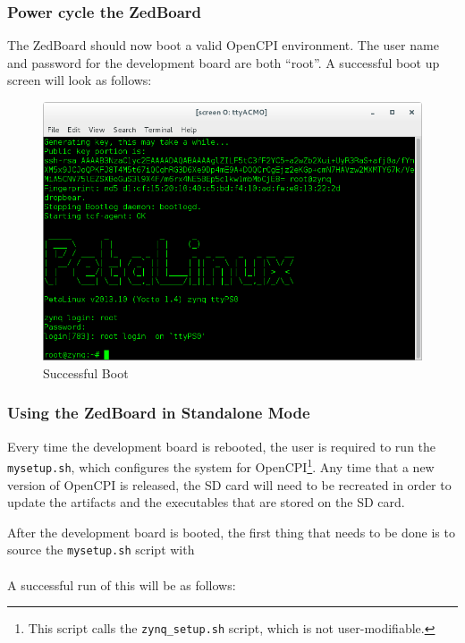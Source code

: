 \subsubsection*{Power cycle the ZedBoard}
The ZedBoard should now boot a valid OpenCPI environment.  The user name and password for the development board are both ``root''.  A successful boot up screen will look as follows:
\begin{figure}[H]
	\centerline{\includegraphics[scale=0.5]{zed_boot}}
	\caption{Successful Boot}
	\label{fig:boot2}
\end{figure}
\newpage
\subsubsection*{Using the ZedBoard in Standalone Mode}
\begin{flushleft}
Every time the development board is rebooted, the user is required to run the \texttt{mysetup.sh}, which configures the system for OpenCPI\footnote{This script calls the \texttt{zynq\_setup.sh} script, which is not user-modifiable.}. Any time that a new version of OpenCPI is released, the SD card will need to be recreated in order to update the artifacts and the executables that are stored on the SD card.
\end{flushleft}
\begin{flushleft}
After the development board is booted, the first thing that needs to be done is to source the \texttt{mysetup.sh} script with\\
\leavevmode{\parindent=3em\indent}\\
A successful run of this will be as follows:
\end{flushleft}



